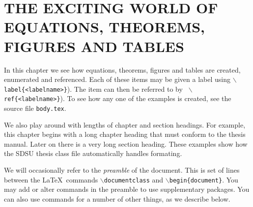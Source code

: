
\chapter{THE EXCITING WORLD OF EQUATIONS,
THEOREMS, FIGURES AND TABLES}
\label{c:main}
In this chapter we see how equations, theorems,
figures and tables are created, enumerated and referenced.
Each of these items may be given a label
using {\tt $\backslash$label\{<labelname>\}}).
The item can then be referred to by {\tt
$\backslash$ref\{<labelname>\}}).
To see how any one of the examples is created, see the source file {\tt body.tex}.

We also play around with lengths of chapter and section headings.
For example, this chapter begins with a long chapter heading that must conform to the
thesis manual.  Later on there is a very long section heading.  These
examples show how the SDSU thesis class file automatically handles
formating.

We will occasionally refer to the {\it preamble} of the document.
This is set of  lines between the \LaTeX\
commands {\tt $\backslash$documentclass} and {\tt $\backslash$begin\{document\}}.
You may add or alter commands in the preamble to use supplementary
packages.  You can also use commands for a number of other things, as
we describe below.


